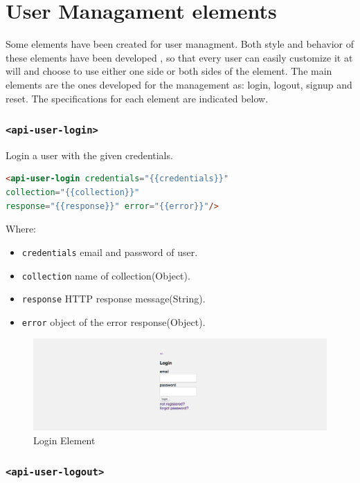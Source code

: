 \section{User Managament elements}

Some elements have been created for user managment.
Both style and behavior of these elements have been developed , so that every user can easily customize it at will and choose to use either one side or both sides of the element.
The main elements are the ones developed for the management as: login, logout, signup and reset.
The specifications for each element are indicated below.

\subsubsection{\texttt{<api-user-login>}}

Login a user with the given credentials.
\begin{lstlisting}[language=html]
<api-user-login credentials="{{credentials}}"
collection="{{collection}}" 
response="{{response}}" error="{{error}}"/>
\end{lstlisting}
Where:
\begin{itemize}
\item \texttt{credentials} email and password of user.
\item \texttt{collection} name of collection(Object).
\item \texttt{response}	HTTP response message(String).
\item \texttt{error} object of the error response(Object).
\end{itemize}

\begin {figure}[h]
\graphicspath{{images/chapter_USR/}}
\includegraphics[width=\textwidth]{usr1}
\caption{Login Element}
\end {figure}

\subsubsection{\texttt{<api-user-logout>}}

